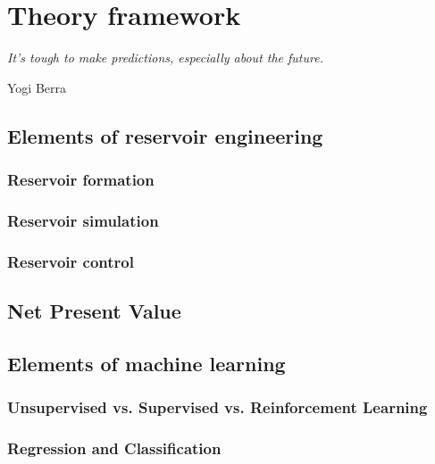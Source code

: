 \chapter{Theory framework}
\label{cap:framework}

\epigraph{\itshape It's tough to make predictions, especially about the future.}{Yogi Berra}

\blindtext[1]

\section{Elements of reservoir engineering}
    \blindtext[1]

\subsection{Reservoir formation}
    \blindtext[1]

\subsection{Reservoir simulation}
    \blindtext[1]

\subsection{Reservoir control}
    \blindtext[1]

\section{Net Present Value}
    \blindtext[1]

\section{Elements of machine learning}
    \blindtext[1]

    \subsection{Unsupervised vs. Supervised vs. Reinforcement Learning}
        \blindtext[1]

    \subsection{Regression and Classification}
        \blindtext[1]

